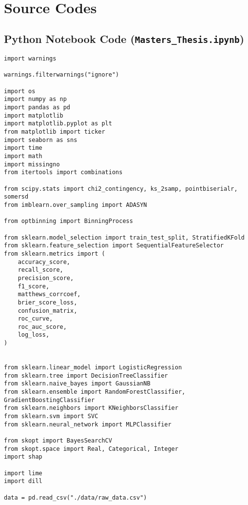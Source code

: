 \fancyheadoffset{0pt}
\chapter{Source Codes}


\section{Python Notebook Code (\lstinline{Masters_Thesis.ipynb})}
\begin{lstlisting}[basicstyle=\footnotesize\ttfamily]
import warnings

warnings.filterwarnings("ignore")

import os
import numpy as np
import pandas as pd
import matplotlib
import matplotlib.pyplot as plt
from matplotlib import ticker
import seaborn as sns
import time
import math
import missingno
from itertools import combinations

from scipy.stats import chi2_contingency, ks_2samp, pointbiserialr, somersd
from imblearn.over_sampling import ADASYN

from optbinning import BinningProcess

from sklearn.model_selection import train_test_split, StratifiedKFold
from sklearn.feature_selection import SequentialFeatureSelector
from sklearn.metrics import (
	accuracy_score,
	recall_score,
	precision_score,
	f1_score,
	matthews_corrcoef,
	brier_score_loss,
	confusion_matrix,
	roc_curve,
	roc_auc_score,
	log_loss,
)


from sklearn.linear_model import LogisticRegression
from sklearn.tree import DecisionTreeClassifier
from sklearn.naive_bayes import GaussianNB
from sklearn.ensemble import RandomForestClassifier, GradientBoostingClassifier
from sklearn.neighbors import KNeighborsClassifier
from sklearn.svm import SVC
from sklearn.neural_network import MLPClassifier

from skopt import BayesSearchCV
from skopt.space import Real, Categorical, Integer
import shap

import lime
import dill

data = pd.read_csv("./data/raw_data.csv")
\end{lstlisting}
